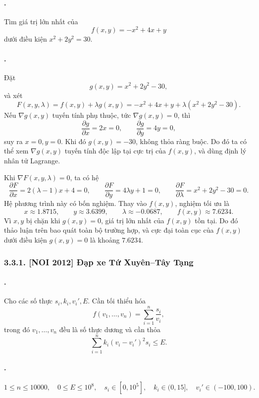 \documentclass[11pt]{article}
\begin{document}
\paragraph{.}
Tìm giá trị lớn nhất của
\[
  f(x,y)=-x^2+4x+y
\]
dưới điều kiện \(x^2+2y^2=30\).

\paragraph{.}
Đặt
\[
  g(x,y)=x^2+2y^2-30,
\]
và xét
\[
  F(x,y,\lambda)=f(x,y)+\lambda g(x,y)
  =-x^2+4x+y+\lambda(x^2+2y^2-30).
\]
Nếu \(\nabla g(x,y)\) tuyến tính phụ thuộc, tức \(\nabla g(x,y)=0\), thì
\[
  \frac{\partial g}{\partial x}=2x=0,\qquad
  \frac{\partial g}{\partial y}=4y=0,
\]
suy ra \(x=0,y=0\). Khi đó \(g(x,y)=-30\), không thỏa ràng buộc. Do đó ta có
thể xem \(\nabla g(x,y)\) tuyến tính độc lập tại cực trị của \(f(x,y)\), và
dùng định lý nhân tử Lagrange.

Khi \(\nabla F(x,y,\lambda)=0\), ta có hệ
\[
  \frac{\partial F}{\partial x}=2(\lambda-1)x+4=0,\qquad
  \frac{\partial F}{\partial y}=4\lambda y+1=0,\qquad
  \frac{\partial F}{\partial \lambda}=x^2+2y^2-30=0.
\]
Hệ phương trình này có bốn nghiệm. Thay vào \(f(x,y)\), nghiệm tối ưu là
\[
  x\approx 1.8715,\qquad y\approx 3.6399,\qquad
  \lambda\approx -0.0687,\qquad f(x,y)\approx 7.6234.
\]
Vì \(x,y\) bị chặn khi \(g(x,y)=0\), giá trị lớn nhất của \(f(x,y)\) tồn tại.
Do đó thảo luận trên bao quát toàn bộ trường hợp, và cực đại toàn cục của
\(f(x,y)\) dưới điều kiện \(g(x,y)=0\) là khoảng \(7.6234\).

\subsubsection*{3.3.1. [NOI 2012] Đạp xe Tứ Xuyên--Tây Tạng}

\paragraph{.}
Cho các số thực \(s_i,k_i,v_i',E\). Cần tối thiểu hóa
\[
  f(v_1,\ldots,v_n)=\sum_{i=1}^{n}\frac{s_i}{v_i},
\]
trong đó \(v_1,\ldots,v_n\) đều là số thực dương và cần thỏa
\[
  \sum_{i=1}^{n} k_i(v_i-v_i')^2s_i\le E.
\]

\paragraph{.}
\[
  1\le n\le 10000,\quad 0\le E\le 10^8,\quad
  s_i\in[0,10^5],\quad k_i\in(0,15],\quad v_i'\in(-100,100).
\]
\end{document}

